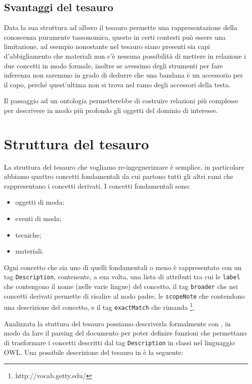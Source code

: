 \subsection{Svantaggi del tesauro}
Data la sua struttura ad albero il tesauro permette una rappresentazione della conoscenza puramente tassonomica, questo in certi contesti può essere una limitazione, ad esempio nonostante nel tesauro siano presenti sia capi d'abbigliamento che materiali non c'è nessuna possibilità di mettere in relazione i due concetti in modo formale, inoltre se avessimo degli strumenti per fare inferenza non saremmo in grado di dedurre che una bandana è un accessorio per il capo, perché quest'ultima non si trova nel ramo degli accessori della testa.

Il passaggio ad un ontologia permetterebbe di costruire relazioni più complesse per descrivere in modo più profondo gli oggetti del dominio di interesse.
\section{Struttura del tesauro}
La struttura del tesauro che vogliamo re-ingegnerizzare è semplice, in particolare abbiamo quattro concetti fondamentali da cui partono tutti gli altri rami che rappresentano i concetti derivati. I concetti fondamentali sono:
\begin{itemize}
	\item oggetti di moda;
	\item eventi di moda;
	\item tecniche;
	\item materiali.
\end{itemize}
Ogni concetto che sia uno di quelli fondamentali o meno è rappresentato con un tag \verb|Description|, contenente, a sua volta, una lista di attributi tra cui le \verb|label| che contengono il nome (nelle varie lingue) del concetto, il tag \verb|broader| che nei concetti derivati permette di risalire al nodo padre, le \verb|scopeNote| che contendono una descrizione del concetto, e il tag \verb|exactMatch| che rimanda \footnote{http://vocab.getty.edu/}.

Analizzata la stuttura del tesauro possiamo descriverla formalmente con \cduce, in modo da fare il parsing del documento per poter definire funzioni che permettano di trasformare i concetti descritti dal tag \verb|Description| in classi nel linguaggio OWL. Una possibile descrizione del tesauro in \cduce è la seguente:
